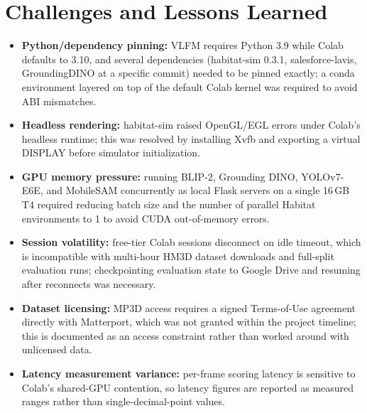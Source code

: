 \documentclass[conference]{IEEEtran}
\begin{document}
\section{Challenges and Lessons Learned}
\begin{itemize}
\item \textbf{Python/dependency pinning:} VLFM requires Python 3.9 while Colab defaults to 3.10, and several dependencies (habitat-sim 0.3.1, salesforce-lavis, GroundingDINO at a specific commit) needed to be pinned exactly; a conda environment layered on top of the default Colab kernel was required to avoid ABI mismatches.
\item \textbf{Headless rendering:} habitat-sim raised OpenGL/EGL errors under Colab's headless runtime; this was resolved by installing Xvfb and exporting a virtual DISPLAY before simulator initialization.
\item \textbf{GPU memory pressure:} running BLIP-2, Grounding DINO, YOLOv7-E6E, and MobileSAM concurrently as local Flask servers on a single 16\,GB T4 required reducing batch size and the number of parallel Habitat environments to 1 to avoid CUDA out-of-memory errors.
\item \textbf{Session volatility:} free-tier Colab sessions disconnect on idle timeout, which is incompatible with multi-hour HM3D dataset downloads and full-split evaluation runs; checkpointing evaluation state to Google Drive and resuming after reconnects was necessary.
\item \textbf{Dataset licensing:} MP3D access requires a signed Terms-of-Use agreement directly with Matterport, which was not granted within the project timeline; this is documented as an access constraint rather than worked around with unlicensed data.
\item \textbf{Latency measurement variance:} per-frame scoring latency is sensitive to Colab's shared-GPU contention, so latency figures are reported as measured ranges rather than single-decimal-point values.
\end{itemize}
\end{document}
